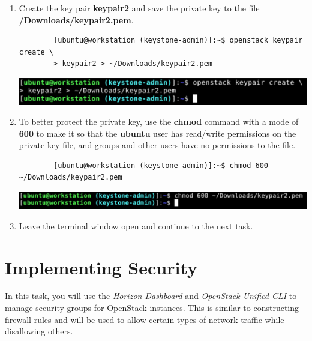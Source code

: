 \documentclass[letterpaper, 12pt]{article}
\begin{document}
\begin{enumerate}
    \item Create the key pair \textbf{keypair2} and save the private key to the file
    \textbf{\texttildemid/Downloads/keypair2.pem}.
    \begin{lstlisting}
        [ubuntu@workstation (keystone-admin)]:~$ openstack keypair create \
        > keypair2 > ~/Downloads/keypair2.pem
    \end{lstlisting}

    \begin{center}
        \includegraphics[width=\linewidth]{images/part4/step7.png}
    \end{center}

    \item To better protect the private key, use the \textbf{chmod} command with a mode of \textbf{600} to make it so
    that the \textbf{ubuntu} user has read/write permissions on the private key file, and groups and other users
    have no permissions to the file.
    \begin{lstlisting}
        [ubuntu@workstation (keystone-admin)]:~$ chmod 600 ~/Downloads/keypair2.pem
    \end{lstlisting}

    \begin{center}
        \includegraphics[width=\linewidth]{images/part4/step8.png}
    \end{center}

    \item Leave the terminal window open and continue to the next task.

\end{enumerate}

\section{Implementing Security}
\label{sec:implementing_security}
In this task, you will use the \textit{Horizon Dashboard} and \textit{OpenStack Unified CLI} to manage security groups
for OpenStack instances. This is similar to constructing firewall rules and will be used to allow certain types of
network traffic while disallowing others.
\end{document}
